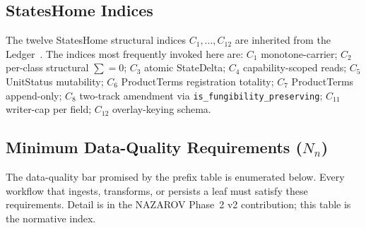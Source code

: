 \documentclass[11pt,a4paper]{article}
\begin{document}
\subsection{StatesHome Indices}
\label{sec:notation-stateshome}

The twelve StatesHome structural indices $C_1,\dots,C_{12}$ are inherited from the Ledger~\cite[\S StatesHome addendum]{ledger}. The indices most frequently invoked here are: $C_1$ monotone-carrier; $C_2$ per-class structural $\sum=0$; $C_3$ atomic StateDelta; $C_4$ capability-scoped reads; $C_5$ UnitStatus mutability; $C_6$ ProductTerms registration totality; $C_7$ ProductTerms append-only; $C_8$ two-track amendment via \texttt{is\_fungibility\_preserving}; $C_{11}$ writer-cap per field; $C_{12}$ overlay-keying schema.

\subsection{Minimum Data-Quality Requirements ($N_n$)}
\label{sec:notation-nbar}

The data-quality bar promised by the prefix table is enumerated below. Every workflow that ingests, transforms, or persists a leaf must satisfy these requirements. Detail is in the NAZAROV Phase~2 v2 contribution; this table is the normative index.
\end{document}
